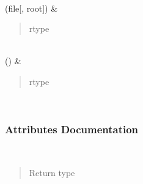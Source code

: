 \documentclass[letterpaper,10pt,english]{sphinxmanual}
\begin{document}
\begin{fulllineitems}
\begin{savenotes}
\begin{longtable}[c]{}
\begin{quote}
\begin{description}
\end{description}\end{quote}

\\
\hline
\sphinxAtStartPar
{\hyperref[\detokenize{api/seyfert.cosmology.redshift_density.RedshiftDensity:seyfert.cosmology.redshift_density.RedshiftDensity.saveToHDF5}]{}}(file{[}, root{]})
&
\sphinxAtStartPar
\begin{quote}\begin{description}
\item[{rtype}] \leavevmode
\sphinxAtStartPar
{}

\end{description}\end{quote}

\\
\hline
\sphinxAtStartPar
{\hyperref[\detokenize{api/seyfert.cosmology.redshift_density.RedshiftDensity:seyfert.cosmology.redshift_density.RedshiftDensity.setUp}]{}}()
&
\sphinxAtStartPar
\begin{quote}\begin{description}
\item[{rtype}] \leavevmode
\sphinxAtStartPar
{}

\end{description}\end{quote}

\\
\hline
\end{longtable}\sphinxatlongtableend\end{savenotes}
\subsubsection*{Attributes Documentation}

\begin{fulllineitems}
\label{\detokenize{api/seyfert.cosmology.redshift_density.RedshiftDensity:seyfert.cosmology.redshift_density.RedshiftDensity.n_bins}}~\begin{quote}\begin{description}
\item[{Return type}] \leavevmode
\sphinxAtStartPar
{}


\end{description}
\end{quote}
\end{fulllineitems}
\end{fulllineitems}
\end{document}
